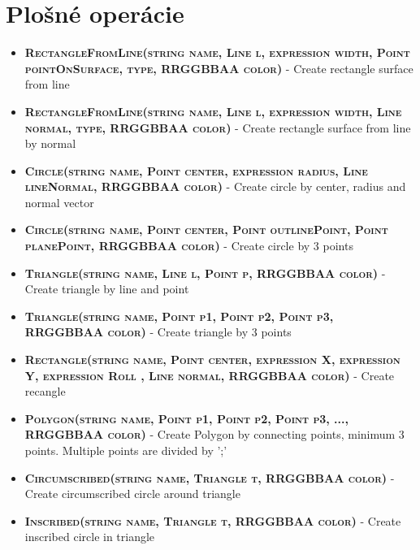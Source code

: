 \section*{Plošné operácie}

\begin{itemize}

\item \textsc{\textbf{RectangleFromLine(string name, Line l, expression width, Point pointOnSurface, type, RRGGBBAA color)}} - Create rectangle surface from line
	
\item \textsc{\textbf{RectangleFromLine(string name, Line l, expression width, Line normal, type, RRGGBBAA color)}} - Create rectangle surface from line by normal

\item \textsc{\textbf{Circle(string name, Point center, expression radius, Line lineNormal, RRGGBBAA color)}} - Create circle by center, radius and normal vector
	
\item \textsc{\textbf{Circle(string name, Point center, Point outlinePoint, Point planePoint, RRGGBBAA color)}} - Create circle by 3 points

\item \textsc{\textbf{Triangle(string name, Line l, Point p, RRGGBBAA color)}} - Create triangle by line and point
	
\item \textsc{\textbf{Triangle(string name, Point p1, Point p2, Point p3, RRGGBBAA color)}} - Create triangle by 3 points


\item \textsc{\textbf{Rectangle(string name, Point center, expression X, expression Y, expression Roll
    , Line normal, RRGGBBAA color)}} - Create recangle

\item \textsc{\textbf{Polygon(string name, Point p1, Point p2, Point p3, ..., RRGGBBAA color)}} - Create Polygon by connecting points, minimum 3 points.  Multiple points are divided by ';'


\item \textsc{\textbf{Circumscribed(string name, Triangle t, RRGGBBAA color)}}  - Create circumscribed circle around triangle
	
\item \textsc{\textbf{Inscribed(string name, Triangle t, RRGGBBAA color)}} - Create inscribed circle in triangle		
	
\end{itemize}
